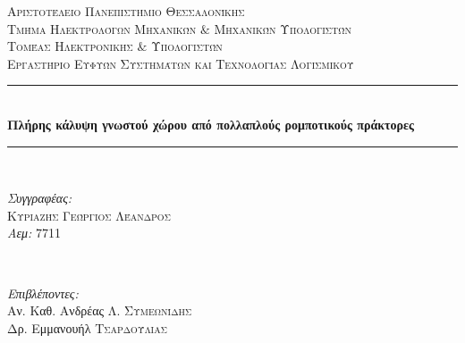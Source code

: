 \begin{titlepage}
    
    \newcommand{\HRule}{\rule{\linewidth}{0.5mm}} %
    
    \center %
     
    
    \textsc{\LARGE Αριστοτέλειο Πανεπιστήμιο Θεσσαλονίκης}\\[1.5cm] %
    \textsc{\Large Τμήμα Ηλεκτρολόγων Μηχανικών $\&$ Μηχανικών Υπολογιστών}\\[0.5cm] %
    \textsc{\large Τομέας Ηλεκτρονικής $\&$ Υπολογιστών}\\[0.5cm] %
    \textsc{\large Εργαστήριο Ευφυών Συστημάτων και Τεχνολογίας Λογισμικού}\\[0.5cm]
    
    
    \HRule \\[0.4cm]
    { \huge \bfseries Πλήρης κάλυψη γνωστού χώρου από πολλαπλούς ρομποτικούς πράκτορες}\\[0.4cm] %
    \HRule \\[1.5cm]
     
    
    \begin{minipage}{0.4\textwidth}
    \begin{flushleft} \large
    \emph{Συγγραφέας:}\\
    \textsc{Κυριαζής Γεώργιος Λέανδρος}\\ %
    \emph{Αεμ:} 7711%
    \end{flushleft}
    \end{minipage}
    ~
    \begin{minipage}{0.5\textwidth}
    \begin{flushright} \large
    \emph{Επιβλέποντες:} \\
    Αν. Καθ. Ανδρέας Λ. \textsc{Συμεωνίδης}\\
    Δρ. Εμμανουήλ \textsc{Τσαρδούλιας} %
    \end{flushright}
    \end{minipage}\\[2cm]
    

\end{titlepage}
